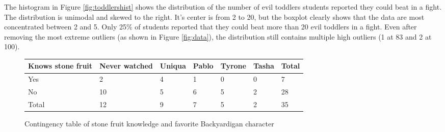\documentclass{article}
\begin{document}
\begin{figure}[ht]
\end{figure}

The histogram in Figure \ref{fig:toddlershist} shows the distribution of the
number of evil toddlers students reported they could beat in a fight. The
distribution is unimodal and skewed to the right. It's center is from 2 to 20,
but the boxplot clearly shows that the data are most concentrated between 2 and
5. Only 25\% of students reported that they could beat more than 20 evil
toddlers in a fight. Even after removing the most extreme outliers (as shown in
Figure \ref{fig:data}), the distribution still contains multiple high outliers
(1 at 83 and 2 at 100).

\begin{figure}[ht]
    \centering
    \caption{Contingency table of stone fruit knowledge and favorite Backyardigan character}
    \label{fig:contingency}
    \begin{tabular}{l|l|l|l|l|l|l}
        \toprule
        Knows stone fruit & Never watched & Uniqua & Pablo & Tyrone & Tasha & Total\\
        \midrule
        Yes & 2 & 4 & 1 & 0 & 0 & 7 \\
        No & 10 & 5 & 6 & 5 & 2 & 28 \\
        Total & 12 & 9 & 7 & 5 & 2 & 35 \\
    \end{tabular}
\end{figure}
\end{document}
